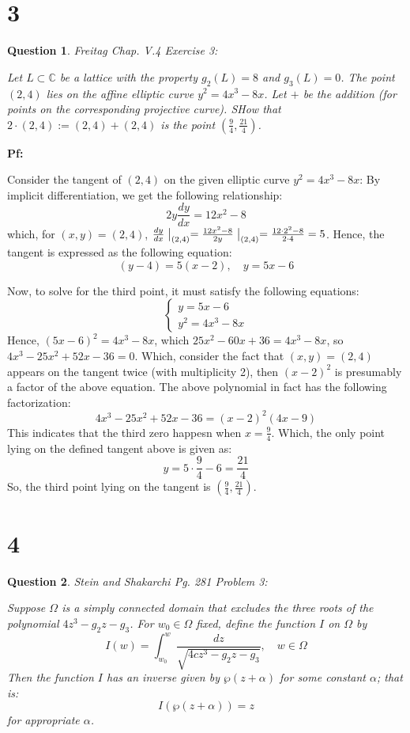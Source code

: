 \documentclass{article}
\newtheorem{question}{Question}
\begin{document}
\break

\section*{3}
\begin{myBox}[]{}
    \begin{question}
        Freitag Chap. V.4 Exercise 3:

        Let $L\subset \mathbb{C}$ be a lattice with the property $g_2(L)=8$ and $g_3(L)=0$. The point $(2,4)$ lies on the affine elliptic curve $y^2=4x^3-8x$.
        Let $+$ be the addition (for points on the corresponding projective curve). SHow that $2\cdot (2,4):= (2,4)+(2,4)$ is the point $(\frac{9}{4},\frac{21}{4})$.
    \end{question}
\end{myBox}

\textbf{Pf:}

Consider the tangent of $(2,4)$ on the given elliptic curve $y^2=4x^3-8x$: By implicit differentiation, we get the following relationship:
$$2y\frac{dy}{dx}=12x^2-8$$
which, for $(x,y)=(2,4)$, $\frac{dy}{dx}\bigm|_{(2,4)}=\frac{12x^2-8}{2y}\bigm|_{(2,4)} = \frac{12\cdot 2^2-8}{2\cdot 4} = 5$. Hence, the tangent is expressed as the following equation:
$$(y-4)=5(x-2),\quad y=5x-6$$

\hfil

Now, to solve for the third point, it must satisfy the following equations:
$$\begin{cases}
    y=5x-6\\
    y^2=4x^3-8x
\end{cases}$$
Hence, $(5x-6)^2 = 4x^3-8x$, which $25x^2-60x+36 = 4x^3-8x$, so $4x^3-25x^2+52x-36 = 0$. Which, consider the fact that $(x,y)=(2,4)$ appears on the tangent twice (with multiplicity 2),
then $(x-2)^2$ is presumably a factor of the above equation. The above polynomial in fact has the following factorization:
$$4x^3-25x^2+52x-36 = (x-2)^2(4x-9)$$
This indicates that the third zero happesn when $x=\frac{9}{4}$. Which, the only point lying on the defined tangent above is given as:
$$y=5\cdot\frac{9}{4}-6 = \frac{21}{4}$$
So, the third point lying on the tangent is $(\frac{9}{4},\frac{21}{4})$.


\break

\section*{4}
\begin{myBox}[]{}
    \begin{question}
        Stein and Shakarchi Pg. 281 Problem 3:

        Suppose $\Omega$ is a simply connected domain that excludes the three roots of the polynomial $4z^3-g_2z-g_3$.
        For $w_0\in\Omega$ fixed, define the function $I$ on $\Omega$ by 
        $$I(w)=\int_{w_0}^{w}\frac{dz}{\sqrt{4cz^3-g_2z-g_3}},\quad w\in\Omega$$
        Then the function $I$ has an inverse given by $\wp(z+\alpha)$ for some constant $\alpha$; that is:
        $$I(\wp(z+\alpha))=z$$
        for appropriate $\alpha$.
    \end{question}
\end{myBox}
\end{document}
